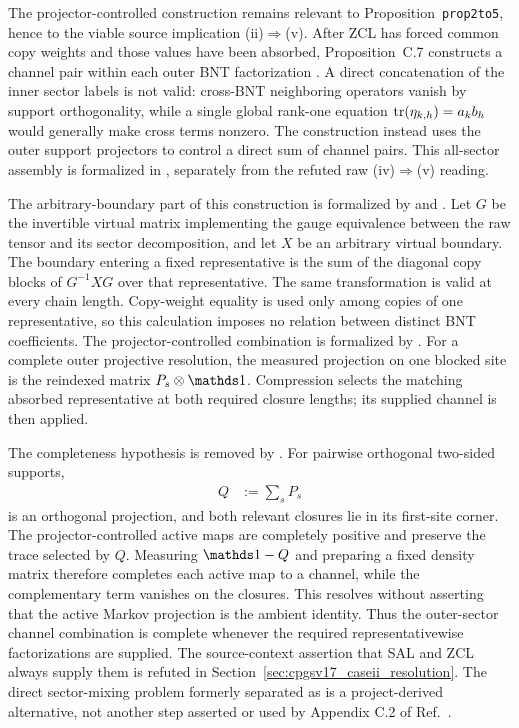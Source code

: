 \documentclass{article}
\begin{document}
The projector-controlled construction remains relevant to
Proposition~\texttt{prop2to5}, hence to the viable source implication
(ii)$\Rightarrow$(v). After ZCL has forced common copy weights and those
values have been absorbed, Proposition~C.7 constructs a channel pair within
each outer BNT factorization
\cite[Appendix~C.2]{Cirac2016MPDO_arXiv}. A direct concatenation of the inner
sector labels is not valid: cross-BNT neighboring operators vanish by support
orthogonality, while a single global rank-one equation
$\operatorname{tr}(\eta_{k,h})=a_kb_h$ would generally make cross terms nonzero. The
construction instead uses the outer support projectors to control a direct sum
of channel pairs. This all-sector assembly is formalized in ,
separately from the refuted raw (iv)$\Rightarrow$(v) reading.

The arbitrary-boundary part of this construction is formalized by
 and
. Let $G$ be the
invertible virtual matrix implementing the gauge equivalence between the raw
tensor and its sector decomposition, and let $X$ be an arbitrary virtual
boundary. The boundary entering a fixed representative is the sum of the
diagonal copy blocks of $G^{-1}XG$ over that representative. The same
transformation is valid at every chain length. Copy-weight equality is used
only among copies of one representative, so this calculation imposes no
relation between distinct BNT coefficients. The projector-controlled
combination is formalized by
. For a complete outer
projective resolution, the measured projection on one blocked site is the
reindexed matrix $P_s\otimes\Id$. Compression selects the matching absorbed
representative at both required closure lengths; its supplied channel is then
applied.

The completeness hypothesis is removed by
.
For pairwise orthogonal two-sided supports,
\begin{align}
    Q
        &:= \sum_sP_s
    \label{eq:cpgsv17_outer_support_projection}
\end{align}
is an orthogonal projection, and both relevant closures lie in its first-site
corner. The projector-controlled active maps are completely positive and
preserve the trace selected by $Q$. Measuring $\Id-Q$ and preparing a fixed
density matrix therefore completes each active map to a channel, while the
complementary term vanishes on the closures. This resolves 
without asserting that the active Markov projection is the ambient identity.
Thus the outer-sector channel combination is complete whenever the required
representativewise factorizations are supplied. The source-context assertion
that SAL and ZCL always supply them is refuted in
Section~\ref{sec:cpgsv17_caseii_resolution}. The direct sector-mixing problem
formerly separated as  is a project-derived alternative, not another step asserted or used by
Appendix C.2 of Ref.~\cite{Cirac2016MPDO_arXiv}.
\end{document}
